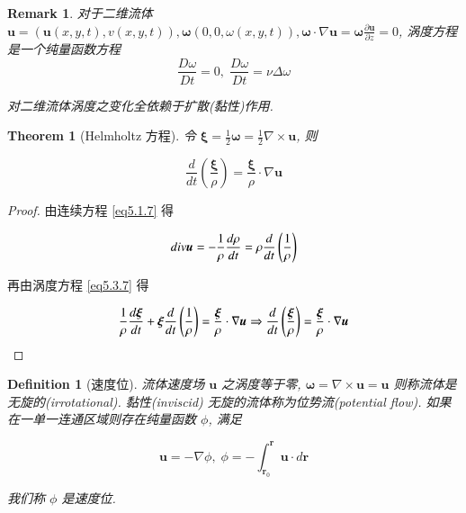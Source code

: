 \documentclass[11pt]{article}
\newtheorem{theorem}{Theorem}[subsection]
\newtheorem{definition}{Definition}[subsection]
\newtheorem{remark}{Remark}[subsection]
\begin{document}
\begin{remark}
	对于二维流体 $\boldsymbol{u} = \left( {\boldsymbol{u}\left( {x,y,t} \right),v\left( {x,y,t} \right)} \right),\boldsymbol{\omega} \left( {0,0,\omega \left( {x,y,t} \right)} \right),\boldsymbol{\omega}  \cdot \nabla \boldsymbol{u} = \boldsymbol{\omega} \frac{{\partial \boldsymbol{u}}}{{\partial z}} = 0$, 涡度方程是一个纯量函数方程
	\begin{equation}
	\frac{{D\omega }}{{Dt}} = 0,\;\frac{{D\omega }}{{Dt}} = \nu \Delta \omega 
	\label{eq5.3.10}
	\end{equation}
	
	对二维流体涡度之变化全依赖于扩散(黏性)作用.
\end{remark}

\begin{theorem}[\kaishu Helmholtz 方程]
	令 $ \boldsymbol{\xi}  = \frac{1}{2}\boldsymbol{\omega}  = \frac{1}{2}\nabla  \times \boldsymbol{u}$, 则
	
	\begin{equation}
	\frac{d}{{dt}}\left( {\frac{\boldsymbol{\xi} }{\rho }} \right) = \frac{\boldsymbol{\xi} }{\rho } \cdot \nabla \boldsymbol{u}
	\label{eq5.3.11}
	\end{equation}
\end{theorem}

\begin{proof}
	
	\kaishu
	
	由连续方程 \ref{eq5.1.7} 得
	
	\begin{equation}
	div \boldsymbol{u} =  - \frac{1}{\rho }\frac{{d\rho }}{{dt}} = \rho \frac{d}{{dt}}\left( {\frac{1}{\rho }} \right)
	\notag 
	\end{equation}
	
	再由涡度方程 \ref{eq5.3.7} 得
	
	\begin{equation}
	\frac{1}{\rho }\frac{{d\boldsymbol{\xi} }}{{dt}} + \boldsymbol{\xi} \frac{d}{{dt}}\left( {\frac{1}{\rho }} \right) = \frac{\boldsymbol{\xi} }{\rho } \cdot \nabla \boldsymbol{u} \Rightarrow \frac{d}{{dt}}\left( {\frac{\boldsymbol{\xi} }{\rho }} \right) = \frac{\boldsymbol{\xi} }{\rho } \cdot \nabla \boldsymbol{u}
	\notag 
	\end{equation}
	
	
\end{proof}


\begin{definition}[\kaishu 速度位]
	流体速度场 $ \boldsymbol{u} $ 之涡度等于零, $\boldsymbol{\omega} = \nabla  \times \boldsymbol{u} = \boldsymbol{u}$ 则称流体是无旋的(irrotational). 黏性(inviscid) 无旋的流体称为位势流(potential flow). 如果在一单一连通区域则存在纯量函数 $ \phi $, 满足
	
	\begin{equation}
	\boldsymbol{u} =  - \nabla \phi ,\;\phi  =  - \int_{{\boldsymbol{r}_0}}^{\boldsymbol{r}} {\boldsymbol{u} \cdot d\boldsymbol{r}} 
	\label{eq5.3.12}
	\end{equation}
	
	我们称 $ \phi $ 是速度位.
	\label{def5.3.3}
\end{definition}
\end{document}
